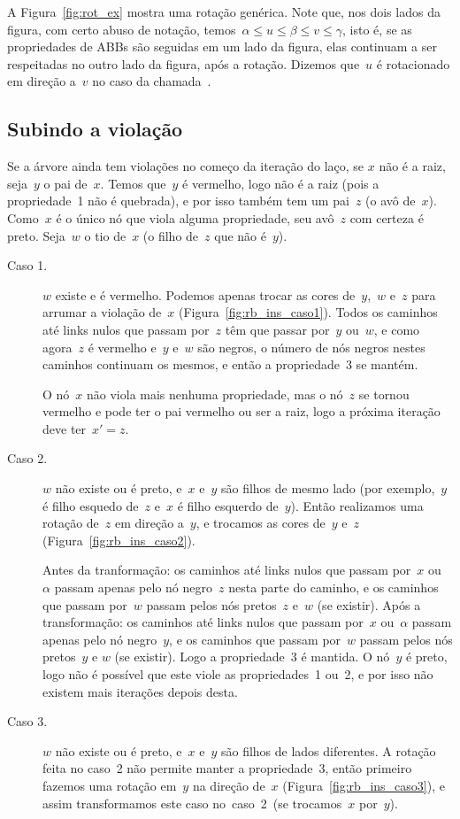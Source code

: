 \documentclass[main.tex]{subfiles}
\begin{document}
A Figura~\ref{fig:rot_ex} mostra uma rotação genérica. Note que, nos dois lados da figura, com certo abuso de notação, temos~${\alpha \leq u \leq \beta \leq v \leq \gamma}$, isto é, se as propriedades de ABBs são seguidas em um lado da figura, elas continuam a ser respeitadas no outro lado da figura, após a rotação. Dizemos que~$u$ é rotacionado em direção a~$v$ no caso da chamada~. %

\subsection{Subindo a violação}

Se a árvore ainda tem violações no começo da iteração do laço, se $x$ não é a raiz, seja~$y$ o pai de~$x$. Temos que~$y$ é vermelho, logo não é a raiz (pois a propriedade~1 não é quebrada), e por isso também tem um pai~$z$ (o avô de~$x$). Como~$x$ é o único nó que viola alguma propriedade, seu avô~$z$ com certeza é preto. Seja~$w$ o tio de~$x$ (o filho de~$z$ que não é~$y$).


\begin{description}
	\item[Caso 1.] $w$ existe e é vermelho. Podemos apenas trocar as cores de~$y$,~$w$ e~$z$ para arrumar a violação de~$x$ (Figura~\ref{fig:rb_ins_caso1}). Todos os caminhos até links nulos que passam por~$z$ têm que passar por~$y$ ou~$w$, e como agora~$z$ é vermelho e~$y$ e~$w$ são negros, o número de nós negros nestes caminhos continuam os mesmos, e então a propriedade~3 se mantém.

	O nó~$x$ não viola mais nenhuma propriedade, mas o nó~$z$ se tornou vermelho e pode ter o pai vermelho ou ser a raiz, logo a próxima iteração deve ter~$x' = z$.

	\item[Caso 2.] $w$ não existe ou é preto, e~$x$ e~$y$ são filhos de mesmo lado (por exemplo,~$y$ é filho esquedo de~$z$ e~$x$ é filho esquerdo de~$y$). Então realizamos uma rotação de~$z$ em direção a~$y$, e trocamos as cores de~$y$ e~$z$ (Figura~\ref{fig:rb_ins_caso2}).

	Antes da tranformação: os caminhos até links nulos que passam por~$x$ ou~$\alpha$ passam apenas pelo nó negro~$z$ nesta parte do caminho, e os caminhos que passam por~$w$ passam pelos nós pretos~$z$ e~$w$ (se existir). Após a transformação: os caminhos até links nulos que passam por~$x$ ou~$\alpha$ passam apenas pelo nó negro~$y$, e os caminhos que passam por~$w$ passam pelos nós pretos~$y$ e $w$ (se existir). Logo a propriedade~3 é mantida. O nó~$y$ é preto, logo não é possível que este viole as propriedades~1 ou~2, e por isso não existem mais iterações depois desta.

	\item[Caso 3.] $w$ não existe ou é preto, e~$x$ e~$y$ são filhos de lados diferentes. A rotação feita no caso~2 não permite manter a propriedade~3, então primeiro fazemos uma rotação em~$y$ na direção de~$x$ (Figura~\ref{fig:rb_ins_caso3}), e assim transformamos este caso no~caso~2~(se trocamos~$x$ por~$y$).

\end{description}
\end{document}
